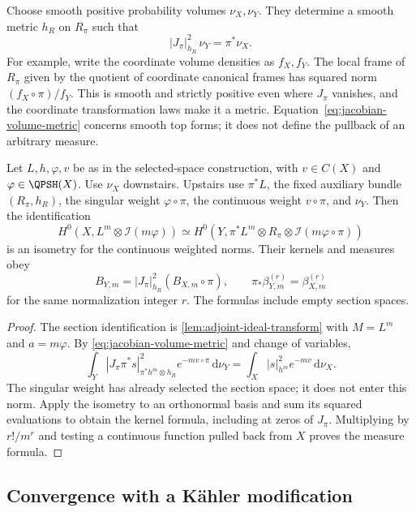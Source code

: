 Choose smooth positive probability volumes $\nu_X,\nu_Y$. They determine a smooth metric $h_R$ on $R_\pi$ such that
\begin{equation}\label{eq:jacobian-volume-metric}
 |J_\pi|_{h_R}^2\,\nu_Y=\pi^*\nu_X.
\end{equation}
For example, write the coordinate volume densities as $f_X,f_Y$. The local frame of $R_\pi$ given by the quotient of coordinate canonical frames has squared norm $(f_X\circ\pi)/f_Y$. This is smooth and strictly positive even where $J_\pi$ vanishes, and the coordinate transformation laws make it a metric. Equation~\eqref{eq:jacobian-volume-metric} concerns smooth top forms; it does not define the pullback of an arbitrary measure.

\begin{proposition}\label{prop:birational-partial-kernel-measures}
Let $L,h,\varphi,v$ be as in the selected-space construction, with $v\in C(X)$ and $\varphi\in\QPSH(X)$. Use $\nu_X$ downstairs. Upstairs use $\pi^*L$, the fixed auxiliary bundle $(R_\pi,h_R)$, the singular weight $\varphi\circ\pi$, the continuous weight $v\circ\pi$, and $\nu_Y$. Then the identification
\[
 H^0(X,L^m\otimes\mathcal I(m\varphi))
 \simeq H^0(Y,\pi^*L^m\otimes R_\pi
                         \otimes\mathcal I(m\varphi\circ\pi))
\]
is an isometry for the continuous weighted norms. Their kernels and measures obey
\[
 B_{Y,m}=|J_\pi|_{h_R}^2(B_{X,m}\circ\pi),
 \qquad \pi_*\beta_{Y,m}^{(r)}=\beta_{X,m}^{(r)}
\]
for the same normalization integer $r$. The formulas include empty section spaces.
\end{proposition}
\begin{proof}
The section identification is \cref{lem:adjoint-ideal-transform} with $M=L^m$ and $a=m\varphi$. By \eqref{eq:jacobian-volume-metric} and change of variables,
\[
 \int_Y|J_\pi\pi^*s|_{\pi^*h^m\otimes h_R}^2e^{-mv\circ\pi}\,\mathrm{d}\nu_Y
 =\int_X|s|_{h^m}^2e^{-mv}\,\mathrm{d}\nu_X.
\]
The singular weight has already selected the section space; it does not enter this norm. Apply the isometry to an orthonormal basis and sum its squared evaluations to obtain the kernel formula, including at zeros of $J_\pi$. Multiplying by $r!/m^r$ and testing a continuous function pulled back from $X$ proves the measure formula.
\end{proof}

\subsection{Convergence with a K\"ahler modification}

